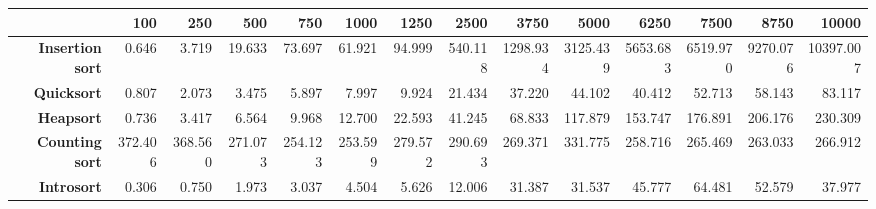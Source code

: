 \begin{tabular}{rrrrrrrrrrrrrr}
\hline
                         &   \textbf{100} &   \textbf{250} &   \textbf{500} &   \textbf{750} &   \textbf{1000} &   \textbf{1250} &   \textbf{2500} &   \textbf{3750} &   \textbf{5000} &   \textbf{6250} &   \textbf{7500} &   \textbf{8750} &   \textbf{10000} \\
\hline
 \textbf{Insertion sort} &          0.646 &          3.719 &         19.633 &         73.697 &          61.921 &          94.999 &         540.118 &        1298.934 &        3125.439 &        5653.683 &        6519.970 &        9270.076 &        10397.007 \\
      \textbf{Quicksort} &          0.807 &          2.073 &          3.475 &          5.897 &           7.997 &           9.924 &          21.434 &          37.220 &          44.102 &          40.412 &          52.713 &          58.143 &           83.117 \\
       \textbf{Heapsort} &          0.736 &          3.417 &          6.564 &          9.968 &          12.700 &          22.593 &          41.245 &          68.833 &         117.879 &         153.747 &         176.891 &         206.176 &          230.309 \\
  \textbf{Counting sort} &        372.406 &        368.560 &        271.073 &        254.123 &         253.599 &         279.572 &         290.693 &         269.371 &         331.775 &         258.716 &         265.469 &         263.033 &          266.912 \\
      \textbf{Introsort} &          0.306 &          0.750 &          1.973 &          3.037 &           4.504 &           5.626 &          12.006 &          31.387 &          31.537 &          45.777 &          64.481 &          52.579 &           37.977 \\
\hline
\end{tabular}